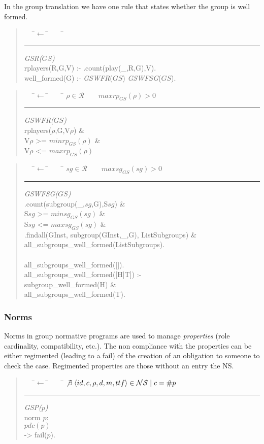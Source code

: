 \documentclass{article}
\newcommand{\st}{\mid}
\newcommand{\set}[1]{\mathcal{#1}}
\newcommand{\andalso}{\quad\quad}
\newenvironment{rwrule}[2]
{\begin{quote}\ttfamily\begin{tabbing}~~~\=$\leftarrow$ \= ~~~ \= \kill
     \ensuremath{#2}\\
     \rule[2pt]{6.5cm}{.3pt} \hfill \rwlabel{#1}\\}
{\end{tabbing}\end{quote}}
\newcommand{\rwlabel}[1]{{\scshape\itshape\textrm{#1}}}
\theoremstyle{definition} \newtheorem{definition}{Definition}
\begin{document}
In the group translation we have one rule that states whether the
group is well formed.

\begin{rwrule}{GSR($GS$)}
  {}
  rplayers(R,G,V) :- .count(play(\_,R,G),V).\\
  well\_formed(G)  :- \rwlabel{GSWFR}($GS$) \rwlabel{GSWFSG}($GS$).
\end{rwrule}

\begin{rwrule}{GSWFR($GS$)}
  {\rho \in \set{R} \andalso maxrp_{GS}(\rho) > 0}
  rplayers($\rho$,G,V$\rho$) \& \\
  V$\rho$ >= $minrp_{GS}(\rho)$ \& \\
  V$\rho$ <= $maxrp_{GS}(\rho)$
\end{rwrule}

\begin{rwrule}{GSWFSG($GS$)}
  {sg \in \set{R} \andalso maxsg_{GS}(sg) > 0}
  .count(subgroup(\_,$sg$,G),S$sg$) \& \\
  S$sg$ >= $minsg_{GS}(sg)$ \& \\
  S$sg$ <= $maxsg_{GS}(sg)$ \& \\
  .findall(GInst, subgroup(GInst,\_,G), ListSubgroups) \& \\
   all\_subgroups\_well\_formed(ListSubgroups).\\
~\\
all\_subgroups\_well\_formed([]).\\
all\_subgroups\_well\_formed([H|T]) :- \\
\> subgroup\_well\_formed(H) \& \\
\> all\_subgroups\_well\_formed(T).
\end{rwrule}

\subsubsection{Norms}

Norms in group normative programs are used to manage \emph{properties}
(role cardinality, compatibility, etc.). The non compliance with the
properties can be either regimented (leading to a fail) of the
creation of an obligation to someone to check the case.  Regimented
properties are those without an entry the NS.

\begin{rwrule}{GSP($p$)}
  {\not \exists \; \langle id, c, \rho, d, m, ttf \rangle \in \set{NS} \st  c = \#p}
  norm $p$: \\
  \> \>         $pdc(p)$\\
  \>   -> \> fail($p$).
\end{rwrule}
\end{document}
